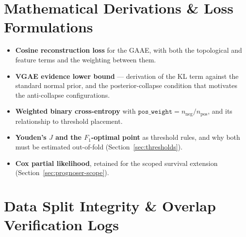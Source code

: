 \appendix

\chapter{Mathematical Derivations \& Loss Formulations}
\label{app:math}


\begin{itemize}
  \item \textbf{Cosine reconstruction loss} for the GAAE, with both the topological and
    feature terms and the weighting between them.
  \item \textbf{VGAE evidence lower bound} --- derivation of the KL term against the
    standard normal prior, and the posterior-collapse condition that motivates the
    anti-collapse configurations.
  \item \textbf{Weighted binary cross-entropy} with $\texttt{pos\_weight} =
    n_{\mathrm{neg}} / n_{\mathrm{pos}}$, and its relationship to threshold placement.
  \item \textbf{Youden's $J$ and the $F_1$-optimal point} as threshold rules, and why both
    must be estimated out-of-fold (Section~\ref{sec:thresholds}).
  \item \textbf{Cox partial likelihood}, retained for the scoped survival extension
    (Section~\ref{sec:prognoser-scope}).
\end{itemize}

\chapter{Data Split Integrity \& Overlap Verification Logs}
\label{app:splits}


